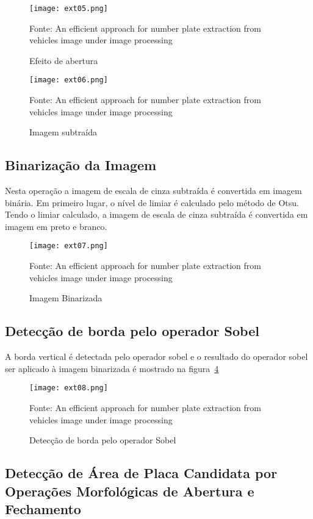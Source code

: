 \begin{figure}[H]
	\centering
	\texttt{[image: ext05.png]}
	\caption{Efeito de abertura}
Fonte: An efficient approach for number plate extraction from vehicles image under image processing~\cite{kaur2014efficient}
	\label{fig:ext_opening_effect}
\end{figure}

\begin{figure}[H]
	\centering
	\texttt{[image: ext06.png]}
	\caption{Imagem subtraída}
Fonte: An efficient approach for number plate extraction from vehicles image under image processing~\cite{kaur2014efficient}
	\label{fig:ext_image_substraction}
\end{figure}

\subsection{Binarização da Imagem}

Nesta operação a imagem de escala de cinza subtraída é convertida em imagem
binária. Em primeiro lugar, o nível de limiar é calculado pelo método de Otsu.
Tendo o limiar calculado, a imagem de escala de cinza subtraída é convertida em
imagem em preto e branco.

\begin{figure}[H]
	\centering
	\texttt{[image: ext07.png]}
	\caption{Imagem Binarizada}
Fonte: An efficient approach for number plate extraction from vehicles image under image processing~\cite{kaur2014efficient}
	\label{fig:ext_binarized_image}
\end{figure}

\subsection{Detecção de borda pelo operador Sobel}

A borda vertical é detectada pelo operador sobel e o resultado do operador sobel
ser aplicado à imagem binarizada é mostrado na figura~\ref{fig:ext_edge_detection_sobel}

\begin{figure}[H]
	\centering
	\texttt{[image: ext08.png]}
	\caption{Detecção de borda pelo operador Sobel}
Fonte: An efficient approach for number plate extraction from vehicles image under image processing~\cite{kaur2014efficient}
	\label{fig:ext_edge_detection_sobel}
\end{figure}

\subsection{Detecção de Área de Placa Candidata por Operações Morfológicas de Abertura e Fechamento}

